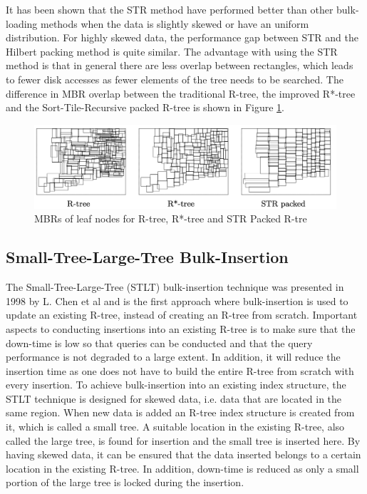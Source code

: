 It has been shown that the STR method have performed better than other bulk-loading methods when the data is slightly skewed or have an uniform distribution. For highly skewed data, the performance gap between STR and the Hilbert packing method is quite similar\cite{STR}. The advantage with using the STR method is that in general there are less overlap between rectangles, which leads to fewer disk accesses as fewer elements of the tree needs to be searched. The difference in MBR overlap between the traditional R-tree, the improved R*-tree and the Sort-Tile-Recursive packed R-tree is shown in Figure \ref{fig:STRTree}.

\begin{figure}[ht]
    \centering
    \includegraphics[scale=0.7]{figures/STR.png}
    \caption{MBRs of leaf nodes for R-tree, R*-tree and STR Packed R-tre\cite{RTreesTheoryApplications}}
    \label{fig:STRTree}
\end{figure}

\subsection{Small-Tree-Large-Tree Bulk-Insertion}
The Small-Tree-Large-Tree (STLT) bulk-insertion technique was presented in 1998 by L. Chen et al\cite{STLT} and is the first approach where bulk-insertion is used to update an existing R-tree, instead of creating an R-tree from scratch. Important aspects to conducting insertions into an existing R-tree is to make sure that the down-time is low so that queries can be conducted and that the query performance is not degraded to a large extent. In addition, it will reduce the insertion time as one does not have to build the entire R-tree from scratch with every insertion. To achieve bulk-insertion into an existing index structure, the STLT technique is designed for skewed data, i.e. data that are located in the same region. When new data is added an R-tree index structure is created from it, which is called a small tree. A suitable location in the existing R-tree, also called the large tree, is found for insertion and the small tree is inserted here. By having skewed data, it can be ensured that the data inserted belongs to a certain location in the existing R-tree. In addition, down-time is reduced as only a small portion of the large tree is locked during the insertion.\newline

